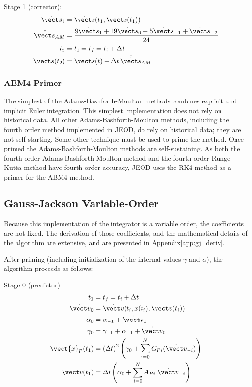 Stage 1 (corrector):
\begin{equation}
\label{eqn:abm4_1}
\begin{split}
\dot{\vect s}_1 &= \dot{\vect s}(t_1,\vect s(t_1)) \\
\bar {\dot{\vect s}}_{AM} &=
  \frac{9\dot{\vect s}_1 +19\dot{\vect s}_0 -
        5\dot{\vect s}_{-1} + \dot{\vect s}_{-2}} {24} \\
t_2 &= t_1 = t_f = t_i + \Delta t \\
\vect s(t_2) &= \vect s(t) + \Delta t \, \bar {\dot{\vect s}}_{AM}
\end{split}
\end{equation}

\subsubsection{ABM4 Primer}
The simplest of the Adams-Bashforth-Moulton methods combines explicit
and implicit Euler integration. This simplest implementation does not
rely on historical data. All other Adams-Bashforth-Moulton methods,
including the fourth order method implemented in JEOD,
do rely on historical data; they are not self-starting.
Some other technique must be used to prime the method.
Once primed the Adams-Bashforth-Moulton methods are self-sustaining.
As both the fourth order Adams-Bashforth-Moulton method and the fourth order
Runge Kutta method have fourth order accuracy, JEOD uses the RK4 method
as a primer for the ABM4 method.



\subsection{Gauss-Jackson Variable-Order}
Because this implementation of the integrator is a variable order, the 
coefficients are not fixed.  The derivation of those coefficients, and the mathematical details of the algorithm are extensive, and are presented in Appendix\ref{app:gj_deriv}.

After priming (including initialization of the internal values $\gamma$ and $\alpha$), the algorithm proceeds as follows:

Stage 0 (predictor)
\begin{equation}
\label{eqn:gauss_jackson_0}
\begin{split}
t_1 &= t_f = t_i + \Delta t \\
\dot{\vect v}_{0} &=
  \dot{\vect v}(t_i, x(t_i),\vect v(t_i)) \\
\alpha_0 &= \alpha_{-1} + \dot{\vect v}_{1} \\
\gamma_{0}&=\gamma_{-1}+\alpha _{-1}+ \dot{\vect v}_{0} \\
\vect{x}_P(t_1) &= \left(\Delta t\right)^{2} \left(\gamma_{0}+
 \sum_{i=0}^{N}G_{Pi}({\dot{\vect v}}_{-i})\right) \\
\vect v(t_1) &= \Delta t
   \left(\alpha_{0} + \sum_{i=0}^{N}A_{Pi}\ \dot{\vect v}_{-i}\right) \\
\end{split}
\end{equation}


